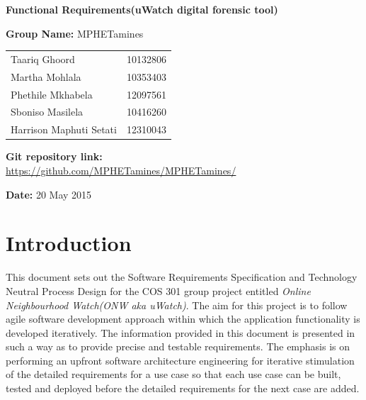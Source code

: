 \documentclass[a4paper,12pt]{article}
\begin{document}
\begin{center}

\Huge\textbf{Functional Requirements(uWatch digital forensic tool)\\}
																											
\vspace{2 cm}

\LARGE\textbf{Group Name:} MPHETamines\newline
 
 
 
 
 
\vspace{0.5 cm}
\begin{tabular}{lr}
Taariq Ghoord&10132806
\\ 
Martha Mohlala&10353403
\\
Phethile Mkhabela&12097561
\\
Sboniso Masilela&10416260
\\
Harrison Maphuti Setati&12310043\\
\end{tabular}

\vspace{1cm}
\textbf{Git repository link:\\}
\url{https://github.com/MPHETamines/MPHETamines/}

\vspace{1cm}
\textbf{Date:} 20 May 2015
\end{center}
\newpage

\tableofcontents







\newpage
{}

\section{Introduction}
This document sets out the Software Requirements Specification and Technology Neutral Process Design for the COS 301 group project entitled \textit{Online Neighbourhood Watch(ONW aka uWatch)}.
The aim for this project is to follow agile software development approach within which the application functionality is developed 
iteratively. 
The information provided in this document is presented in such a way as to provide precise and testable requirements. The emphasis is on performing an upfront software 
architecture engineering for iterative stimulation of the detailed requirements for a use case so that each use case can be built, tested and deployed before the detailed 
requirements for the next case are added.
\end{document}
